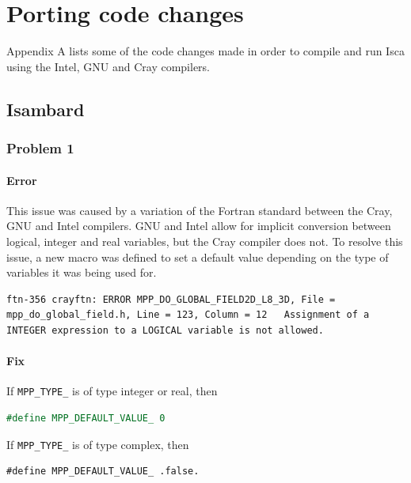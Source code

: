 \documentclass[a4paper,11pt]{report}
\begin{document}






\appendix
\chapter{Porting code changes}
\label{apdx:porting}
Appendix A lists some of the code changes made in order to compile and run Isca using the Intel, GNU and Cray compilers. 
\section*{Isambard}
\subsection*{Problem 1}
\subsubsection*{Error}
This issue was caused by a variation of the Fortran standard between the Cray, GNU and Intel compilers. GNU and Intel allow for implicit conversion between logical, integer and real variables, but the Cray compiler does not. To resolve this issue, a new macro was defined to set a default value depending on the type of variables it was being used for. 
\begin{lstlisting}
ftn-356 crayftn: ERROR MPP_DO_GLOBAL_FIELD2D_L8_3D, File = mpp_do_global_field.h, Line = 123, Column = 12   Assignment of a INTEGER expression to a LOGICAL variable is not allowed.
\end{lstlisting}

\subsubsection*{Fix}
If \texttt{MPP\_TYPE\_} is of type integer or real, then 
\begin{lstlisting}[language=Fortran]
#define MPP_DEFAULT_VALUE_ 0
\end{lstlisting}
\par
If \texttt{MPP\_TYPE\_} is of type complex, then 
\begin{lstlisting}
#define MPP_DEFAULT_VALUE_ .false.
\end{lstlisting}
\end{document}
